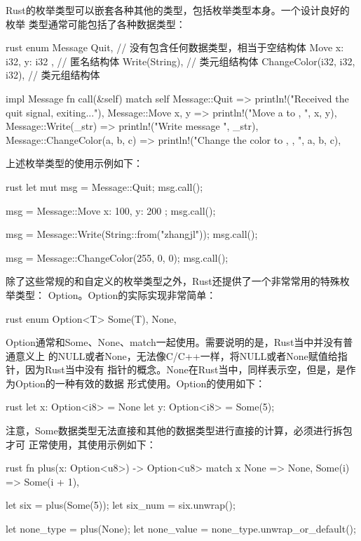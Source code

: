 Rust的枚举类型可以嵌套各种其他的类型，包括枚举类型本身。一个设计良好的枚举
类型通常可能包括了各种数据类型：
\begin{code-block}{rust}
enum Message {
    Quit, // 没有包含任何数据类型，相当于空结构体
    Move { x: i32, y: i32 }, // 匿名结构体
    Write(String), // 类元组结构体
    ChangeColor(i32, i32, i32), // 类元组结构体
}

impl Message {
    fn call(&self) {
        match self {
            Message::Quit => println!("Received the quit signal, exiting..."),
            Message::Move { x, y } => println!("Move a to {}, {}", x, y),
            Message::Write(_str) => println!("Write message {}", _str),
            Message::ChangeColor(a, b, c) =>
                println!("Change the color to {}, {}, {}", a, b, c),
        }
    }
}
\end{code-block}
上述枚举类型的使用示例如下：
\begin{code-block}{rust}
let mut msg = Message::Quit;
msg.call();

msg = Message::Move { x: 100, y: 200 };
msg.call();

msg = Message::Write(String::from("zhangjl"));
msg.call();

msg = Message::ChangeColor(255, 0, 0);
msg.call();
\end{code-block}

除了这些常规的和自定义的枚举类型之外，Rust还提供了一个非常常用的特殊枚举类型：
Option。Option的实际实现非常简单：
\begin{code-block}{rust}
enum Option<T> {
    Some(T),
    None,
}
\end{code-block}
Option通常和Some、None、match一起使用。需要说明的是，Rust当中并没有普通意义上
的NULL或者None，无法像C/C++一样，将NULL或者None赋值给指针，因为Rust当中没有
指针的概念。None在Rust当中，同样表示空，但是，是作为Option的一种有效的数据
形式使用。Option的使用如下：
\begin{code-block}{rust}
let x: Option<i8> = None
let y: Option<i8> = Some(5);
\end{code-block}
注意，Some数据类型无法直接和其他的数据类型进行直接的计算，必须进行拆包才可
正常使用，其使用示例如下：
\begin{code-block}{rust}
fn plus(x: Option<u8>) -> Option<u8> {
    match x {
       None => None,
       Some(i) => Some(i + 1),
    }
}

let six = plus(Some(5));
let six_num = six.unwrap();

let none_type = plus(None);
let none_value = none_type.unwrap_or_default();
\end{code-block}

